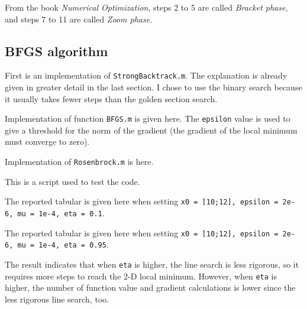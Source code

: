 \documentclass{article}
\begin{document}
From the book \emph{Numerical Optimization}, steps 2 to 5 are called \emph{Bracket phase}, and steps 7 to 11 are called \emph{Zoom phase}.

\subsection*{BFGS algorithm}

First is an implementation of \lstinline{StrongBacktrack.m}. The explanation is already given in greater detail in the last section. I chose to use the binary search because it usually takes fewer steps than the golden section search.



Implementation of function \lstinline{BFGS.m} is given here. The \lstinline{epsilon} value is used to give a threshold for the norm of the gradient (the gradient of the local minimum must converge to zero).



Implementation of \lstinline{Rosenbrock.m} is here.



This is a script used to test the code.



The reported tabular is given here when setting \lstinline{x0 = [10;12], epsilon = 2e-6, mu = 1e-4, eta = 0.1}.



The reported tabular is given here when setting \lstinline{x0 = [10;12], epsilon = 2e-6, mu = 1e-4, eta = 0.95}.



The result indicates that when \lstinline{eta} is higher, the line search is less rigorous, so it requires more steps to reach the 2-D local minimum. However, when \lstinline{eta} is higher, the number of function value and gradient calculations is lower since the less rigorous line search, too.
\end{document}
